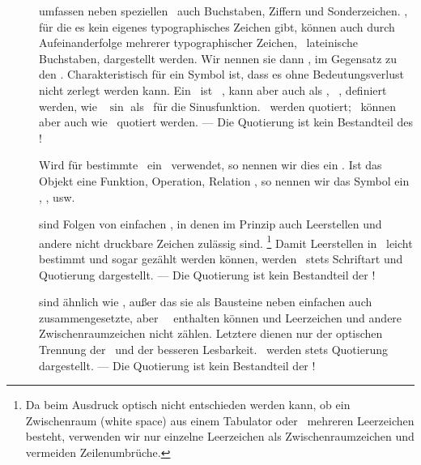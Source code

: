\begin{description}

	\item [\Symbole] umfassen neben speziellen \Symbolen\ auch Buchstaben, Ziffern und Sonderzeichen.
	\Symbole, für die es kein eigenes typographisches Zeichen gibt, können auch durch Aufeinanderfolge mehrerer typographischer Zeichen, \textiAlg\ lateinische Buchstaben, dargestellt werden.
	Wir nennen sie dann , im Gegensatz zu den .
	Charakteristisch für ein Symbol ist, dass es ohne Bedeutungsverlust nicht zerlegt werden kann.
	Ein \zusammengesetztesSymbol\ ist \textiAlg\ \zerlegbar, kann aber auch als \atomar, \textdh\ \unzerlegbar, definiert werden, wie \textzB\ $\sin$ als \Symbol\ für die Sinusfunktion.
	\Symbole\ werden  quotiert; \zerlegbare\ können aber auch wie \Zeichenfolgen\ quotiert werden.
	--- Die Quotierung ist kein Bestandteil des \Symbols!

	Wird für bestimmte \Objekte\ ein \Symbol\ verwendet, so nennen wir dies ein .
	Ist das Objekt eine Funktion, Operation, Relation \textusw, so nennen wir das Symbol ein , ,  usw.

	\item [\Zeichenketten] sind Folgen von einfachen \Symbolen, in denen im Prinzip auch Leerstellen und andere nicht druckbare Zeichen zulässig sind.%
	\footnote{%
		Da beim Ausdruck optisch nicht entschieden werden kann, ob ein Zwischenraum (white space) aus einem Tabulator oder \textevtl\ mehreren Leerzeichen besteht, verwenden wir nur einzelne Leerzeichen als Zwischenraumzeichen und vermeiden Zeilenumbrüche.
	}
	Damit Leerstellen in \Zeichenketten\ leicht bestimmt und sogar gezählt werden können,
	werden \Zeichenketten\ stets  Schriftart und Quotierung dargestellt.
	--- Die Quotierung ist kein Bestandteil der \Zeichenkette!

	\item [\Zeichenfolgen] sind ähnlich wie \Zeichenketten, außer das sie als Bausteine neben einfachen auch zusammengesetzte, aber \atomare\ \Symbole\ enthalten können und Leerzeichen und andere Zwischenraumzeichen nicht zählen.
	Letztere dienen nur der optischen Trennung der \Symbole\ und der besseren Lesbarkeit.
	\Zeichenfolgen\ werden stets  Quotierung dargestellt.
	--- Die Quotierung ist kein Bestandteil der \Zeichenfolge!


\end{description}
